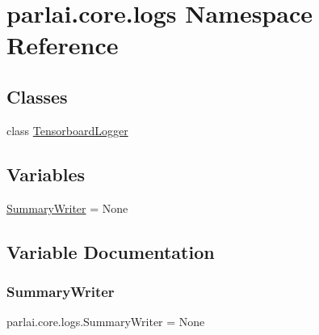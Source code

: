 \hypertarget{namespaceparlai_1_1core_1_1logs}{}\section{parlai.\+core.\+logs Namespace Reference}
\label{namespaceparlai_1_1core_1_1logs}
\subsection*{Classes}
\begin{DoxyCompactItemize}
\item 
class \hyperlink{classparlai_1_1core_1_1logs_1_1TensorboardLogger}{Tensorboard\+Logger}
\end{DoxyCompactItemize}
\subsection*{Variables}
\begin{DoxyCompactItemize}
\item 
\hyperlink{namespaceparlai_1_1core_1_1logs_a214c91224d7834e7962d77d49f17bbc4}{Summary\+Writer} = None
\end{DoxyCompactItemize}


\subsection{Variable Documentation}
\mbox{\label{namespaceparlai_1_1core_1_1logs_a214c91224d7834e7962d77d49f17bbc4}} 
\subsubsection{\texorpdfstring{Summary\+Writer}{SummaryWriter}}
{\footnotesize\ttfamily parlai.\+core.\+logs.\+Summary\+Writer = None}

